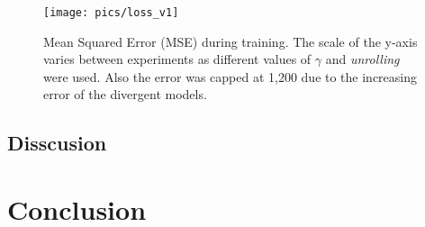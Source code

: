 \documentclass[
  openany]{book}
\begin{document}
\begin{figure}

{\centering \texttt{[image: pics/loss\_v1]} 

}

\caption{Mean Squared Error (MSE) during training. The scale of the y-axis varies between experiments as different values of \(\gamma\) and \emph{unrolling} were used. Also the error was capped at 1,200 due to the increasing error of the divergent models.}\label{fig:loss}
\end{figure}

\hypertarget{disscusion}{%
\section{Disscusion}\label{disscusion}}

\hypertarget{conclusion}{%
\chapter{Conclusion}\label{conclusion}}
\end{document}
